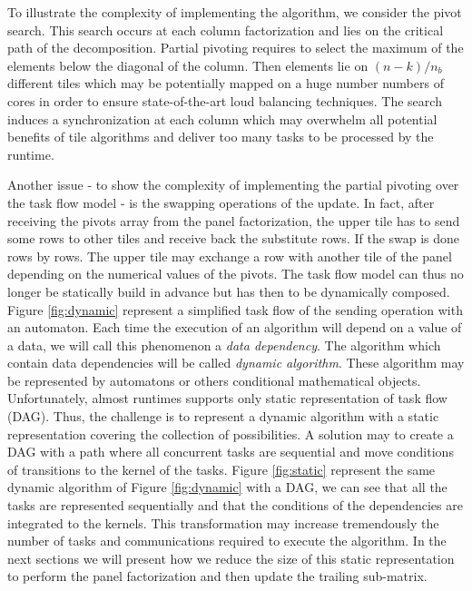 To illustrate the complexity of implementing the algorithm, we consider the pivot search. This search occurs at each column factorization and lies on the critical path of the decomposition. Partial pivoting requires to select the maximum of the elements below the diagonal of the column. Then elements lie on $(n-k)/n_b$ different tiles which may be potentially mapped on a huge number numbers of cores in order to ensure state-of-the-art loud balancing techniques. The search induces a synchronization at each column which may overwhelm all potential benefits of tile algorithms and deliver too many tasks to be processed by the runtime.

Another issue - to show the complexity of implementing the partial pivoting over the task flow model - is the swapping operations of the update. In fact, after receiving the pivots array from the panel factorization, the upper tile has to send some rows to other tiles and receive back the substitute rows. If the swap is done rows by rows. The upper tile may exchange a row with another tile of the panel depending on the numerical values of the pivots. The task flow model can thus no longer be statically build in advance but has then to be dynamically composed. Figure \ref{fig:dynamic} represent a simplified task flow of the sending operation with an automaton. Each time the execution of an algorithm will depend on a value of a data, we will call this phenomenon a \emph{data dependency}. The algorithm which contain data dependencies will be called \emph{dynamic algorithm}. These algorithm may be represented by automatons or others conditional mathematical objects. Unfortunately, almost runtimes supports only static representation of task flow (DAG). Thus, the challenge is to represent a dynamic algorithm with a static representation covering the collection of possibilities. A solution may to create a DAG with a path where all concurrent tasks are sequential and move conditions of transitions to the kernel of the tasks. Figure \ref{fig:static} represent the same dynamic algorithm of Figure \ref{fig:dynamic} with a DAG, we can see that all the tasks are represented sequentially and that the conditions of the dependencies are integrated to the kernels. This transformation may increase tremendously the number of tasks and communications required to execute the algorithm. In the next sections we will present how we reduce the size of this static representation to perform the panel factorization and then update the trailing sub-matrix.

